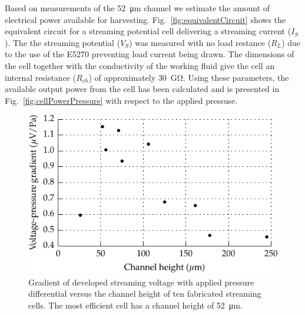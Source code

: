\documentclass[10pt,final,journal]{IEEEtran}
\begin{document}
    Based on measurements of the \SI{52}{\micro\meter} channel we estimate the amount of electrical power available for harvesting.
    Fig.~\ref{fig:equivalentCircuit} shows the equivalent circuit for a streaming potential cell delivering a streaming current ($I_{S}$).
    The the streaming potential ($V_{S}$) was measured with no load restance ($R_{L}$) due to the use of the E5270 preventing load current being drawn.
    The dimensions of the cell together with the conductivity of the working fluid give the cell an internal resistance ($R_{ch}$) of approximately \SI{30}{\giga\ohm}.
    Using these parameters, the available output power from the cell has been calculated and is presented in Fig.~\ref{fig:cellPowerPressure} with respect to the applied pressuse.

    \begin{figure}
        \begin{center}
        \includegraphics[width=\linewidth]{graph_cellEfficiency}
        \end{center}
        \caption{Gradient of developed streaming voltage with applied pressure differential versus the channel height of ten fabricated streaming cells.
        The most efficient cell has a channel height of \SI{52}{\micro\meter}.}
        \label{fig:cellEfficiency}
    \end{figure}
\end{document}
